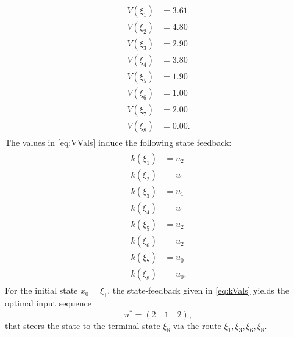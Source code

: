 \documentclass[]{article}
\newcommand{\xnull}{x_0}
\newcommand{\VstateVal}[2]{V(\xi_#1) &= #2}
\newcommand{\kstateVal}[2]{k(\xi_#1) &= #2}
\begin{document}
\begin{enumerate}
				\begin{align}
					\begin{split} \label{eq:VVals}
				    \VstateVal{1}{3.61}\\
					\VstateVal{2}{4.80}\\
					\VstateVal{3}{2.90}\\
					\VstateVal{4}{3.80}\\
					\VstateVal{5}{1.90}\\
					\VstateVal{6}{1.00}\\
					\VstateVal{7}{2.00}\\
					\VstateVal{8}{0.00}.
					\end{split}
				\end{align}
				The values in \eqref{eq:VVals} induce the following state feedback:\\
				\begin{align} \label{eq:kVals}
					\begin{split}
					\kstateVal{1}{u_2}\\
					\kstateVal{2}{u_1}\\
					\kstateVal{3}{u_1}\\
					\kstateVal{4}{u_1}\\
					\kstateVal{5}{u_2}\\
					\kstateVal{6}{u_2}\\
					\kstateVal{7}{u_0}\\
					\kstateVal{8}{u_0}.
					\end{split}
				\end{align}
			For the initial state $ \xnull = \xi_1 $, the state-feedback given in \eqref{eq:kVals} yields the optimal input sequence
			\[ u^* = \left(2 \quad 1 \quad 2\right), \] that steers the state to the terminal state $ \xi_8  $ via the route $ \xi_1,\xi_3,\xi_6,\xi_8 $.
			

\end{enumerate}
\end{document}
